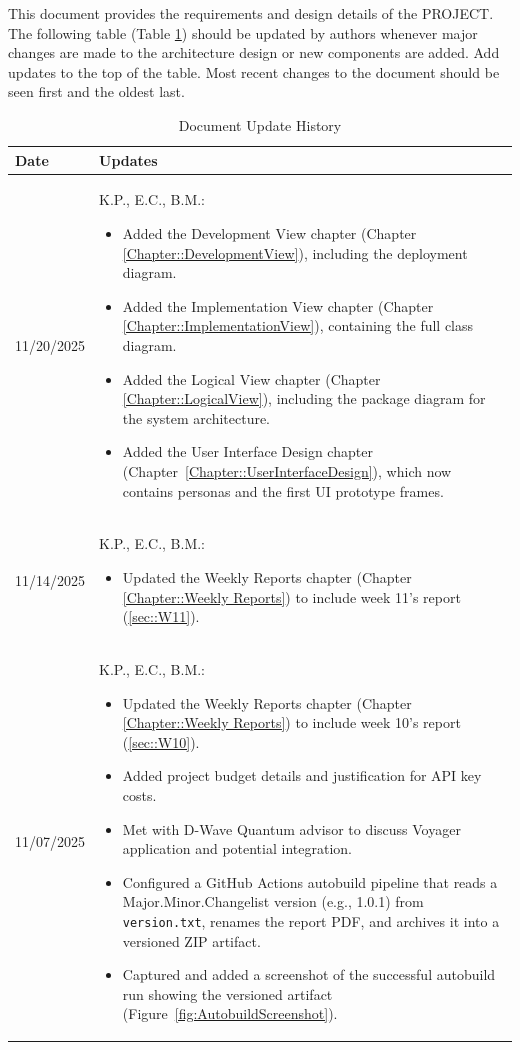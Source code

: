 This document provides the requirements and design details of the
PROJECT.  The following table (Table \ref{Table::UpdateHistory}) should be
updated by authors whenever major changes are made to the architecture
design or new components are added. Add updates to the top of the table.  
Most recent changes to the document should be seen first and the oldest 
last.

\begin{longtable}{|l||p{13.5cm}|}
\caption{Document Update History \label{Table::UpdateHistory}}\\
\hline
\textbf{Date} & \textbf{Updates} \\
\hline 
\endhead

11/20/2025 & K.P., E.C., B.M.:
\begin{itemize}[topsep=0pt,itemsep=0pt,parsep=0pt,partopsep=0pt,leftmargin=12pt]
\item Added the Development View chapter (Chapter \ref{Chapter::DevelopmentView}), 
including the deployment diagram.
\item Added the Implementation View chapter (Chapter \ref{Chapter::ImplementationView}), 
containing the full class diagram.
\item Added the Logical View chapter (Chapter \ref{Chapter::LogicalView}), 
including the package diagram for the system architecture.
\item Added the User Interface Design chapter (Chapter~\ref{Chapter::UserInterfaceDesign}), 
which now contains personas and the first UI prototype frames.

\end{itemize}
\\ \hline


11/14/2025 & K.P., E.C., B.M.:
\begin{itemize}[topsep=0pt,itemsep=0pt,parsep=0pt,partopsep=0pt,leftmargin=12pt]
\item Updated the Weekly Reports chapter (Chapter \ref{Chapter::Weekly Reports}) to include week 11's report (\ref{sec::W11}).
\end{itemize}
\\ \hline

11/07/2025 & K.P., E.C., B.M.:
\begin{itemize}[topsep=0pt,itemsep=0pt,parsep=0pt,partopsep=0pt,leftmargin=12pt]
\item Updated the Weekly Reports chapter (Chapter \ref{Chapter::Weekly Reports}) to include week 10's report (\ref{sec::W10}).
\item Added project budget details and justification for API key costs.
\item Met with D-Wave Quantum advisor to discuss Voyager application and potential integration.
\item Configured a GitHub Actions autobuild pipeline that reads a Major.Minor.Changelist version (e.g., 1.0.1) from \texttt{version.txt}, renames the report PDF, and archives it into a versioned ZIP artifact.
\item Captured and added a screenshot of the successful autobuild run showing the versioned artifact (Figure~\ref{fig:AutobuildScreenshot}).
\end{itemize}
\\ \hline



\end{longtable}
